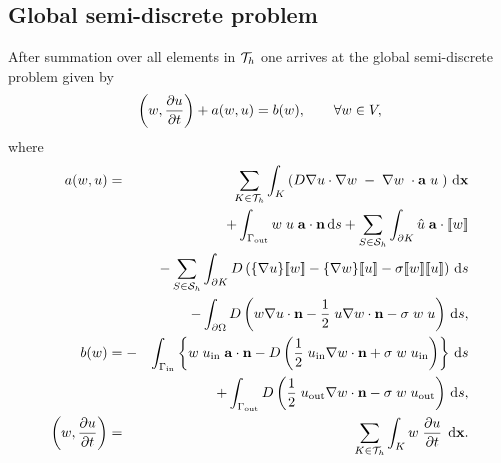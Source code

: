 \documentclass[mathserif]{beamer}
\begin{document}
\subsection{Global semi-discrete problem}
\begin{frame}


After summation over all elements in ${\cal T}_h$ one arrives at the global 
semi-discrete problem given by
\begin{equation}
\left(w,\frac{\partial u}{\partial t}\right)+a(w,u)=b(w),\qquad \forall w\in V,
\label{weakglob}
\end{equation}
where
\begin{eqnarray}
a(w,u)&=&\sum_{K\in {\cal T}_h}\int_{K}\left( D \nabla u \cdot \nabla w 
\;-\; \nabla w \; \cdot\ba \; u \; \right)\dx\nonumber\\
&&+\int_{\Gamma_{\rm out}} w \; u \; \ba\cdot\bn\ds 
+\sum_{S\in {\cal S}_h}\int_{\p K} \hat u \; \ba \cdot \jump{w}\nonumber\\
&&-\sum_{S\in {\cal S}_h}\int_{\p K} D \left(\{\nabla u\} \jump{w}
- \{\nabla w \} \jump{u} 
- \sigma \jump{w} \jump{u} \right) \ds\nonumber\\
&&-\int_{\p \Omega} D \left(w \nabla u \cdot \bn - \frac 12 \; u \nabla w \cdot \bn 
- \sigma \; w \; u \right) \ds, \label{glob1}\\
b(w)&=-&\int_{\Gamma_{\rm in}} \left\{ w \; u_{\rm in} \; \ba\cdot\bn
- D \left(\frac 12 \; u_{\rm in} \nabla w \cdot \bn 
+ \sigma \; w \; u_{\rm in}  \right) \right\}\ds\nonumber\\
&&+\int_{\Gamma_{\rm out}} D \left(\frac 12 \; u_{\rm out} \nabla w \cdot \bn 
- \sigma \; w \; u_{\rm out}  \right) \ds,\label{glob2}\\
\left(w,\pd{u}{t}\right)&=&\sum_{K\in {\cal T}_h}\int_{K}w\; \pd{u}{t}\; \dx.
\label{glob3}
\end{eqnarray}
\end{frame}
\end{document}
